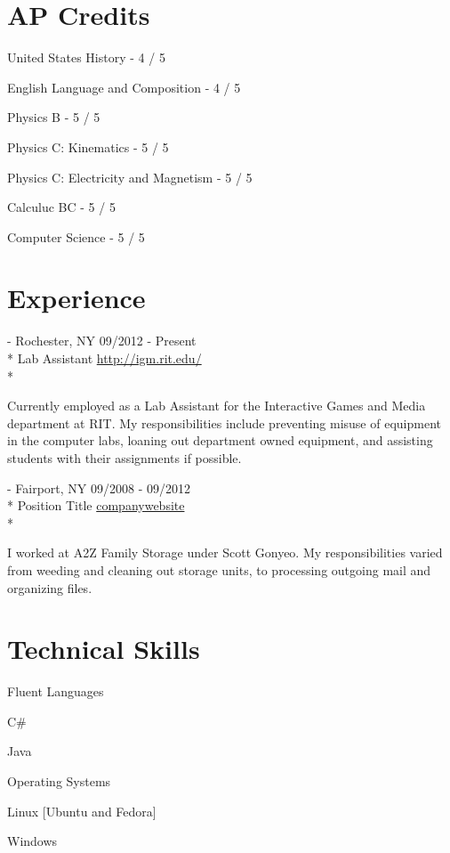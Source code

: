 \documentclass[a4paper,margin,line]{resume}
\newcommand{\rurl}[1]{\hfill {\footnotesize \url{#1}}}
\newcommand{\rdate}[1]{\hfill {\small #1}}
\renewcommand{\employer}[5]{\item[#1] - #2 \rdate{#3} \\* #4 \rurl{#5} \\*}
\begin{document}
\begin{resume}
\section{\mysidestyle AP Credits}
        \begin{compactitem}
                \item United States History - {\small 4 / 5}
                \item English Language and Composition - {\small 4 / 5}
                \item Physics B - {\small 5 / 5}
                \item Physics C: Kinematics - {\small 5 / 5}
                \item Physics C: Electricity and Magnetism - {\small 5 / 5}
                \item Calculuc BC - {\small 5 / 5}
                \item Computer Science - {\small 5 / 5}
        \end{compactitem}
\section{\mysidestyle Experience}
	\begin{asparadesc}
		\employer{Interactive Games and Media at RIT}{Rochester, NY}{09/2012 - Present}{Lab Assistant}{http://igm.rit.edu/}

		\small
		Currently employed as a Lab Assistant for the Interactive Games and Media department at RIT. My responsibilities include preventing misuse of equipment in the computer labs, loaning out department owned equipment, and assisting students with their assignments if possible.
		\normalsize
		\\
		\employer{Compass Properties}{Fairport, NY}{09/2008 - 09/2012}{Position Title}{companywebsite}

                \small
                I worked at A2Z Family Storage under Scott Gonyeo. My responsibilities varied from weeding and cleaning out storage units, to processing outgoing mail and organizing files.
    		\normalsize

\section{\mysidestyle Technical Skills}
	\begin{compactdesc}
		\item[Fluent Languages] \begin{inparaenum} { \small
			\item C\#
			\item Java
		} \end{inparaenum}
		\item[Operating Systems] \begin{inparaenum} { \small
			\item Linux [Ubuntu and Fedora]
			\item Windows
		} \end{inparaenum}
	\end{compactdesc}


\end{asparadesc}
\end{resume}
\end{document}

